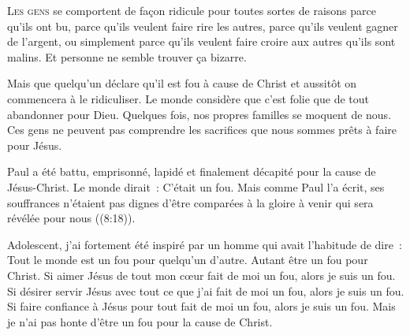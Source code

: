 

\lettrine{L}{es gens} se comportent de façon ridicule
 pour toutes sortes de raisons \ocadr parce qu'ils ont bu,
 parce qu'ils veulent faire rire les autres,
 parce qu'ils veulent gagner de l'argent,
 ou simplement parce qu'ils veulent faire croire aux autres qu'ils sont malins.
 Et personne ne semble trouver ça bizarre.

Mais que quelqu'un déclare qu'il est fou à cause de Christ
 et aussitôt on commencera à le ridiculiser.
 Le monde considère que c'est folie que de tout abandonner pour Dieu.
 Quelques fois, nos propres familles se moquent de nous.
 Ces gens ne peuvent pas comprendre les sacrifices
 que nous sommes prêts à faire pour Jésus.

Paul a été battu, emprisonné, lapidé et finalement décapité
 pour la cause de Jésus-Christ. Le monde dirait~: 
 \og C'était un fou. \fg{}
 Mais comme Paul l'a écrit, ses souffrances n'étaient pas
 \og dignes d'être comparées à la gloire à venir
 qui sera révélée pour nous \fg{}\linebreak ((8:18)).


Adolescent, j'ai fortement été inspiré par un homme
 qui avait l'habitude de dire~: 
 \og Tout le monde est un fou pour quelqu'un d'autre.
 Autant être un fou pour Christ. \fg{}
 Si aimer Jésus de tout mon c\oe{}ur fait de moi un fou,
 alors je suis un fou. Si désirer servir Jésus avec tout ce que j'ai
 fait de moi un fou, alors je suis un fou.
 Si faire confiance à Jésus pour tout fait de moi un fou,
 alors je suis un fou.
 Mais je n'ai pas honte d'être un fou pour la cause de Christ.

\dvrule








